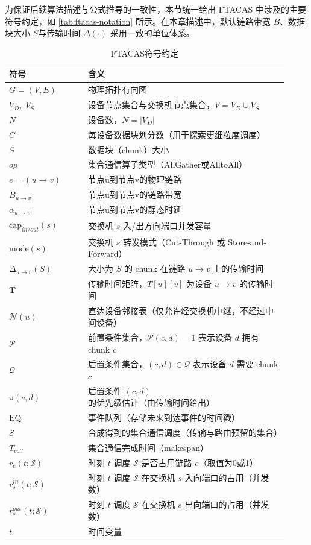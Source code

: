 为保证后续算法描述与公式推导的一致性，本节统一给出 FTACAS 中涉及的主要符号约定，如 \autoref{tab:ftacas-notation} 所示。在本章描述中，默认链路带宽 $B$、数据块大小 $S$与传输时间 $\Delta(\cdot)$ 采用一致的单位体系。

\begin{table}[!htbp]
\centering
\caption{FTACAS符号约定}
\label{tab:ftacas-notation}
\begin{tabular}{p{0.26\linewidth}p{0.66\linewidth}}
\hline
符号 & 含义 \\
\hline
$G=(V,E)$ & 物理拓扑有向图 \\
$V_D,\;V_S$ & 设备节点集合与交换机节点集合，$V=V_D\cup V_S$ \\
$N$ & 设备数，$N=|V_D|$ \\
$C$ & 每设备数据块划分数（用于探索更细粒度调度） \\
$S$ & 数据块（chunk）大小 \\
$op$ & 集合通信算子类型（AllGather或AlltoAll） \\
$e=(u\rightarrow v)$ & 节点u到节点v的物理链路\\
$B_{u\rightarrow v}$ & 节点u到节点v的链路带宽\\
$\alpha_{u\rightarrow v}$ & 节点u到节点v的静态时延 \\
$\mathrm{cap}_{in/out}(s)$ & 交换机 $s$ 入/出方向端口并发容量 \\
$\mathrm{mode}(s)$ & 交换机 $s$ 转发模式（Cut-Through 或 Store-and-Forward） \\
$\Delta_{u\rightarrow v}(S)$ & 大小为 $S$ 的 chunk 在链路 $u\rightarrow v$ 上的传输时间 \\
$\boldsymbol{T}$ & 传输时间矩阵，$T[u][v]$ 为设备 $u\rightarrow v$ 的传输时间 \\
$\mathcal{N}(u)$ & 直达设备邻接表（仅允许经交换机中继，不经过中间设备） \\
$\mathcal{P}$ & 前置条件集合，$\mathcal{P}(c,d)=1$ 表示设备 $d$ 拥有 chunk $c$ \\
$\mathcal{Q}$ & 后置条件集合，$(c,d)\in\mathcal{Q}$ 表示设备 $d$ 需要 chunk $c$ \\
$\pi(c,d)$ & 后置条件 $(c,d)$ 的优先级估计（由传输时间给出） \\
$\mathrm{EQ}$ & 事件队列（存储未来到达事件的时间戳） \\
$\mathcal{S}$ & 合成得到的集合通信调度（传输与路由预留的集合） \\
$T_{coll}$ & 集合通信完成时间（makespan） \\
$r_e(t;\mathcal{S})$ & 时刻 $t$ 调度 $\mathcal{S}$ 是否占用链路 $e$（取值为0或1） \\
$r^{in}_s(t;\mathcal{S})$ & 时刻 $t$ 调度 $\mathcal{S}$ 在交换机 $s$ 入向端口的占用（并发数） \\
$r^{out}_s(t;\mathcal{S})$ & 时刻 $t$ 调度 $\mathcal{S}$ 在交换机 $s$ 出向端口的占用（并发数） \\
$t$ & 时间变量 \\
\hline
\end{tabular}
\end{table}

